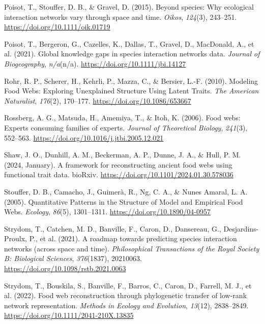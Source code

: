 \documentclass[
]{agujournal2019}
\newlength{\cslhangindent}
\newenvironment{CSLReferences}[2] %
 {\begin{list}{}{%
  \setlength{\itemindent}{0pt}
  \setlength{\leftmargin}{0pt}
  \setlength{\parsep}{0pt}
  \ifodd #1
   \setlength{\leftmargin}{\cslhangindent}
   \setlength{\itemindent}{-1\cslhangindent}
  \fi
  \setlength{\itemsep}{#2\baselineskip}}}
 {\end{list}}
\begin{document}
\begin{CSLReferences}{1}{0}
Poisot, T., Stouffer, D. B., \& Gravel, D. (2015). Beyond species: Why
ecological interaction networks vary through space and time.
\emph{Oikos}, \emph{124}(3), 243--251.
\url{https://doi.org/10.1111/oik.01719}

Poisot, T., Bergeron, G., Cazelles, K., Dallas, T., Gravel, D.,
MacDonald, A., et al. (2021). Global knowledge gaps in species
interaction networks data. \emph{Journal of Biogeography},
\emph{n/a}(n/a). \url{https://doi.org/10.1111/jbi.14127}

Rohr, R. P., Scherer, H., Kehrli, P., Mazza, C., \& Bersier, L.-F.
(2010). Modeling {Food Webs}: {Exploring Unexplained Structure Using
Latent Traits}. \emph{The American Naturalist}, \emph{176}(2), 170--177.
\url{https://doi.org/10.1086/653667}

Rossberg, A. G., Matsuda, H., Amemiya, T., \& Itoh, K. (2006). Food
webs: {Experts} consuming families of experts. \emph{Journal of
Theoretical Biology}, \emph{241}(3), 552--563.
\url{https://doi.org/10.1016/j.jtbi.2005.12.021}

Shaw, J. O., Dunhill, A. M., Beckerman, A. P., Dunne, J. A., \& Hull, P.
M. (2024, January). A framework for reconstructing ancient food webs
using functional trait data. {bioRxiv}.
\url{https://doi.org/10.1101/2024.01.30.578036}

Stouffer, D. B., Camacho, J., Guimerà, R., Ng, C. A., \& Nunes Amaral,
L. A. (2005). Quantitative {Patterns} in the {Structure} of {Model} and
{Empirical Food Webs}. \emph{Ecology}, \emph{86}(5), 1301--1311.
\url{https://doi.org/10.1890/04-0957}

Strydom, T., Catchen, M. D., Banville, F., Caron, D., Dansereau, G.,
Desjardins-Proulx, P., et al. (2021). A roadmap towards predicting
species interaction networks (across space and time).
\emph{Philosophical Transactions of the Royal Society B: Biological
Sciences}, \emph{376}(1837), 20210063.
\url{https://doi.org/10.1098/rstb.2021.0063}

Strydom, T., Bouskila, S., Banville, F., Barros, C., Caron, D., Farrell,
M. J., et al. (2022). Food web reconstruction through phylogenetic
transfer of low-rank network representation. \emph{Methods in Ecology
and Evolution}, \emph{13}(12), 2838--2849.
\url{https://doi.org/10.1111/2041-210X.13835}


\end{CSLReferences}
\end{document}
